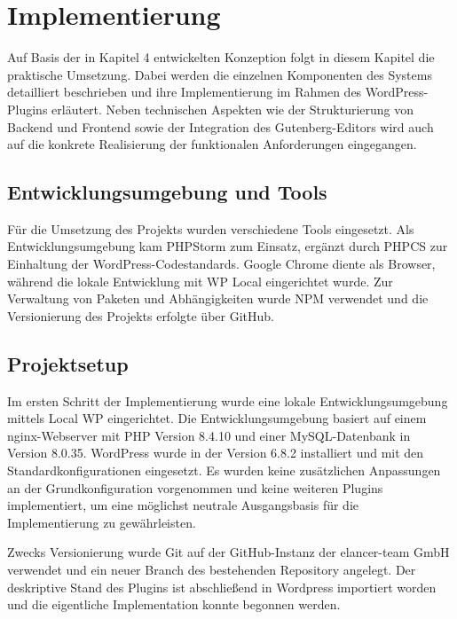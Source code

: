 \chapter{Implementierung}
\label{chap:literature}
Auf Basis der in Kapitel 4 entwickelten Konzeption folgt in diesem Kapitel die praktische Umsetzung. Dabei werden die einzelnen Komponenten des Systems detailliert beschrieben und ihre Implementierung im Rahmen des WordPress-Plugins erläutert. Neben technischen Aspekten wie der Strukturierung von Backend und Frontend sowie der Integration des Gutenberg-Editors wird auch auf die konkrete Realisierung der funktionalen Anforderungen eingegangen.
\section{Entwicklungsumgebung und Tools}
Für die Umsetzung des Projekts wurden verschiedene Tools eingesetzt.
Als Entwicklungsumgebung kam PHPStorm zum Einsatz, ergänzt durch PHPCS zur Einhaltung der WordPress-Codestandards.
Google Chrome diente als Browser, während die lokale Entwicklung mit \gls{WP} Local eingerichtet wurde.
Zur Verwaltung von Paketen und Abhängigkeiten wurde \gls{NPM} verwendet und die Versionierung des Projekts erfolgte über GitHub.

\section{Projektsetup}
Im ersten Schritt der Implementierung wurde eine lokale Entwicklungsumgebung mittels Local WP eingerichtet.
Die Entwicklungsumgebung basiert auf einem nginx-Webserver mit PHP Version 8.4.10 und einer MySQL-Datenbank in Version 8.0.35.
WordPress wurde in der Version 6.8.2 installiert und mit den Standardkonfigurationen eingesetzt.
Es wurden keine zusätzlichen Anpassungen an der Grundkonfiguration vorgenommen und keine weiteren Plugins implementiert, um eine möglichst neutrale Ausgangsbasis für die Implementierung zu gewährleisten.

Zwecks Versionierung wurde Git auf der GitHub-Instanz der elancer-team GmbH verwendet und ein neuer Branch des bestehenden Repository angelegt.
Der deskriptive Stand des Plugins ist abschließend in Wordpress importiert worden und die eigentliche Implementation konnte begonnen werden.

